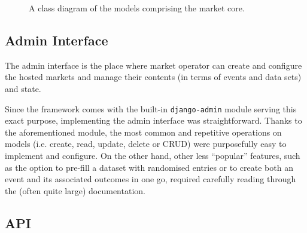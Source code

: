 \documentclass[bsc,frontabs,twoside,singlespacing,parskip,deptreport]{infthesis}     %
\begin{document}
\begin{figure}
\noindent{}
\label{fig:model_diagram}
\caption{A class diagram of the models comprising the market core. }
\end{figure}


\subsection{Admin Interface}

    The admin interface is the place where market operator can create and configure the hosted markets and manage their contents (in terms of events and data sets) and state.

    Since the framework comes with the built-in {\tt django-admin} module serving this exact purpose, implementing the admin interface was straightforward. Thanks to the aforementioned module, the most common and repetitive operations on models (i.e. create, read, update, delete or CRUD) were purposefully easy to implement and configure. On the other hand, other less ``popular'' features, such as the option to pre-fill a dataset with randomised entries or to create both an event and its associated outcomes in one go, required carefully reading through the (often quite large) documentation.   

\subsection{API}
    
\end{document}
